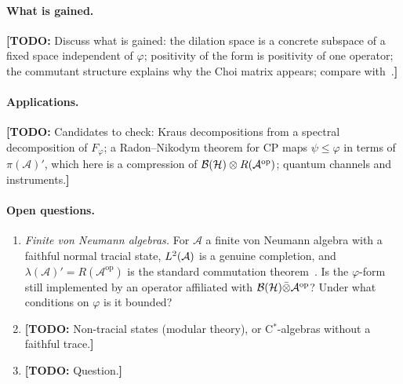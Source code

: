 \documentclass[12pt]{article}
\newcommand{\todo}[1]{\textcolor{\mysubcolor}{\small\textbf{[TODO:} #1\textbf{]}}}
\newcommand{\alg}{\mathcal{A}}             %
\newcommand{\hilb}{\mathcal{H}}            %
\newcommand{\bdd}[1]{\mathcal{B}\br{#1}}   %
\newcommand{\op}{^{\mathrm{op}}}           %
\newcommand{\Ltwo}{L^2\br{\alg}}
\newcommand{\Fphi}{F_{\varphi}}
\begin{document}
\paragraph{What is gained.}
\todo{Discuss what is gained: the dilation space is a concrete subspace of a fixed
space independent of \(\varphi\); positivity of the form is positivity of one
operator; the commutant structure explains why the Choi matrix appears; compare
with~\cite{Kasparov1980,Arveson1969,Paulsen2002}.}

\paragraph{Applications.}
\todo{Candidates to check: Kraus decompositions from a spectral decomposition of
\(\Fphi\); a Radon--Nikodym theorem for CP maps \(\psi \le \varphi\) in terms of
\(\pi(\alg)'\), which here is a compression of \(\bdd\hilb \tensor R(\alg\op)\);
quantum channels and instruments.}

\paragraph{Open questions.}
\begin{enumerate}[label=(Q\arabic*)]
  \item \emph{Finite von Neumann algebras.} For \(\alg\) a finite von Neumann
    algebra with a faithful normal tracial state, \(\Ltwo\) is a genuine
    completion, and \(\lambda(\alg)' = R(\alg\op)\) is the standard commutation
    theorem~\cite{AnantharamanPopa}. Is the \(\varphi\)-form still implemented by
    an operator affiliated with \(\bdd\hilb \bar\tensor \alg\op\)? Under what
    conditions on \(\varphi\) is it bounded?
  \item \todo{Non-tracial states (modular theory), or C\(^*\)-algebras without
    a faithful trace.}
  \item \todo{Question.}
\end{enumerate}



\end{document}
